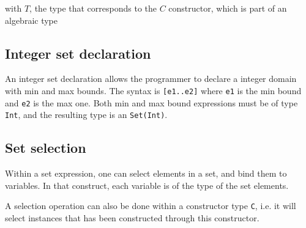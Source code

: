 \documentclass[11pt]{report}
\begin{document}
\begin{center}
 
\DP
\end{center}
\begin{center}with  $T$, the type that corresponds to the $C$ constructor, which is part of an algebraic type\end{center}

\subsection{Integer set declaration}

An integer set declaration allows the programmer to declare a integer domain with min and max bounds. The syntax is \texttt{[e1..e2]} where \texttt{e1} is the min bound and \texttt{e2} is the max one. Both min and max bound expressions must be of type \texttt{Int}, and the resulting type is an \texttt{Set(Int)}.

\begin{center}
 
\DP
\end{center}

\subsection{Set selection}

Within a set expression, one can select elements in a set, and bind them to variables. In that construct, each variable is of the type of the set elements.

\begin{center}
 
\DP
\end{center}

A selection operation can also be done within a constructor type \texttt{C}, i.e. it will select instances that has been constructed through this constructor.

\begin{center}
\DP
\end{center}
\end{document}

